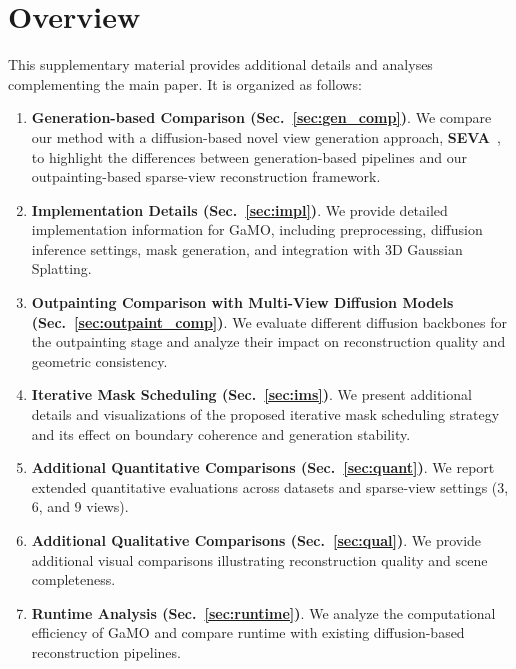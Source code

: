 \section{Overview}

This supplementary material provides additional details and analyses complementing the main paper. It is organized as follows:

\begin{enumerate}

\item \textbf{Generation-based Comparison (Sec.~\ref{sec:gen_comp})}. 
We compare our method with a diffusion-based novel view generation approach, \textbf{SEVA}~\cite{zhou2025stable}, to highlight the differences between generation-based pipelines and our outpainting-based sparse-view reconstruction framework.

\item \textbf{Implementation Details (Sec.~\ref{sec:impl})}. 
We provide detailed implementation information for GaMO, including preprocessing, diffusion inference settings, mask generation, and integration with 3D Gaussian Splatting.

\item \textbf{Outpainting Comparison with Multi-View Diffusion Models (Sec.~\ref{sec:outpaint_comp})}. 
We evaluate different diffusion backbones for the outpainting stage and analyze their impact on reconstruction quality and geometric consistency.

\item \textbf{Iterative Mask Scheduling (Sec.~\ref{sec:ims})}. 
We present additional details and visualizations of the proposed iterative mask scheduling strategy and its effect on boundary coherence and generation stability.

\item \textbf{Additional Quantitative Comparisons (Sec.~\ref{sec:quant})}. 
We report extended quantitative evaluations across datasets and sparse-view settings (3, 6, and 9 views).

\item \textbf{Additional Qualitative Comparisons (Sec.~\ref{sec:qual})}. 
We provide additional visual comparisons illustrating reconstruction quality and scene completeness.

\item \textbf{Runtime Analysis (Sec.~\ref{sec:runtime})}. 
We analyze the computational efficiency of GaMO and compare runtime with existing diffusion-based reconstruction pipelines.


\end{enumerate}
